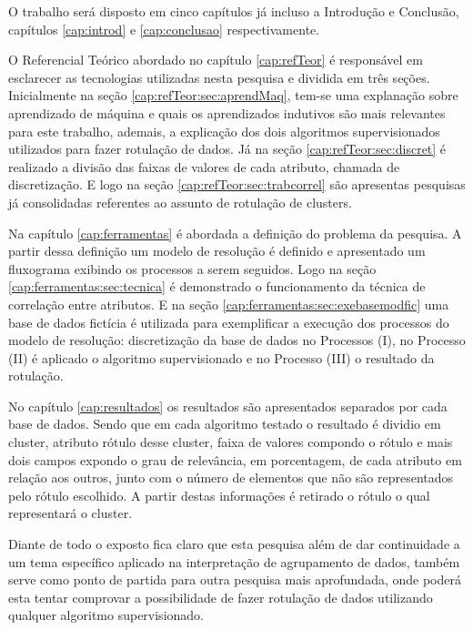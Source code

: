 O trabalho será disposto em cinco capítulos já incluso  a Introdução e Conclusão, capítulos \ref{cap:introd} e \ref{cap:conclusao} respectivamente.  

O Referencial Teórico abordado no capítulo \ref{cap:refTeor} é responsável em esclarecer as tecnologias utilizadas nesta pesquisa e dividida em três seções. Inicialmente na seção \ref{cap:refTeor:sec:aprendMaq}, tem-se uma  explanação sobre aprendizado de máquina e quais os aprendizados indutivos são mais relevantes para este trabalho, ademais, a explicação dos dois algoritmos supervisionados utilizados para fazer rotulação de dados. Já na seção \ref{cap:refTeor:sec:discret} é realizado a divisão das faixas de valores de cada atributo, chamada de discretização. E logo na seção \ref{cap:refTeor:sec:trabcorrel} são apresentas pesquisas já consolidadas  referentes ao assunto de rotulação de clusters.

Na capítulo \ref{cap:ferramentas} é abordada a definição do problema da pesquisa. A partir dessa definição um modelo de resolução é definido e apresentado um fluxograma exibindo os processos a serem seguidos. Logo na seção \ref{cap:ferramentas:sec:tecnica} é demonstrado o funcionamento da técnica de correlação entre atributos. E na seção \ref{cap:ferramentas:sec:exebasemodfic} uma base de dados fictícia é utilizada para exemplificar a execução dos processos do modelo de resolução: discretização da base de dados no Processos (I), no Processo (II) é aplicado o algoritmo supervisionado e no Processo (III) o resultado da rotulação. 

No capítulo \ref{cap:resultados} os resultados são apresentados separados por cada base de dados. Sendo que em cada algoritmo testado o resultado é dividio em cluster, atributo rótulo desse cluster, faixa de valores compondo o rótulo e mais dois campos expondo o grau de relevância, em porcentagem, de cada atributo em relação aos outros, junto com o número de elementos que não são representados pelo rótulo escolhido. A partir destas informações é retirado o rótulo o qual representará o cluster.

Diante de todo o exposto fica claro que esta pesquisa além de dar continuidade a um tema específico aplicado na interpretação de agrupamento de dados, também serve como ponto de partida para outra pesquisa mais aprofundada, onde poderá esta tentar comprovar a possibilidade de fazer rotulação de dados utilizando qualquer algoritmo supervisionado.





